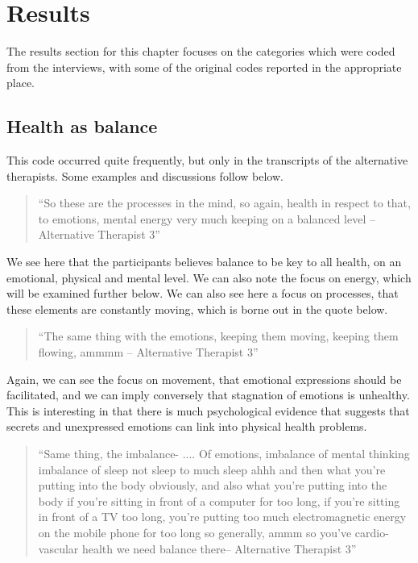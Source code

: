 \section{Results}

The results section for this chapter focuses on the categories which were coded from the interviews, with some of the original codes reported in the appropriate place. 


\subsection{Health as balance}

This code occurred quite frequently, but only in the transcripts of the alternative therapists. Some examples and discussions follow below. 
\begin{quotation}
``So these are the processes in the mind, so again, health in respect to that, to emotions, mental energy very much keeping on a balanced level – Alternative Therapist 3''  
\end{quotation}


We see here that the participants believes balance to be key to all health, on an emotional, physical and mental level. We can also note the focus on energy, which will be examined further below. We can also see here a focus on processes, that these elements are constantly moving, which is borne out in the quote below. 
\begin{quotation}
``The same thing with the emotions, keeping them moving, keeping them flowing, ammmm – Alternative Therapist 3''  
\end{quotation}

Again, we can see the focus on movement, that emotional expressions should be facilitated, and we can imply conversely that stagnation of emotions is unhealthy. This is interesting in that there is much psychological evidence that suggests that secrets and unexpressed emotions can link into physical health problems. 

\begin{quotation}
``Same thing, the imbalance-
....
Of emotions, imbalance of mental thinking imbalance of sleep not sleep to much sleep ahhh and then what you're putting into the body obviously, and also what you're putting into the body if you're sitting in front of a computer for too long, if you're sitting in front of a TV too long, you're putting too much electromagnetic energy on the mobile phone for too long so generally, ammm so you've cardio-vascular health we need balance there-- Alternative Therapist 3''  
\end{quotation}


